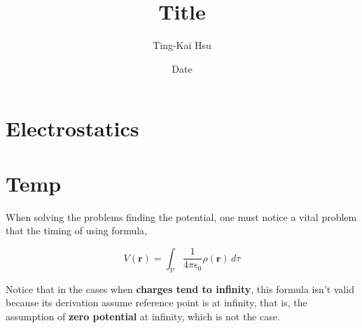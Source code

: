 \documentclass[12pt]{article}
\title{Title}
\author{Ting-Kai Hsu}
\date{Date}
\begin{document}
\maketitle
\tableofcontents

\section{Electrostatics}


\section{Temp}
When solving the problems finding the potential, one must notice a vital problem that the timing of using formula,

\begin{center}
    \[ V(\mathbf{r}) = \int_{\mathcal{V}} \frac{1}{4 \pi \epsilon_0 }\rho(\mathbf{r}) \, d\tau \]
\end{center}

Notice that in the cases when \textbf{charges tend to infinity}, this formula isn't valid because its derivation assume reference point is at infinity, that is, the assumption of \textbf{zero potential} at infinity, which is not the case.
\end{document}
